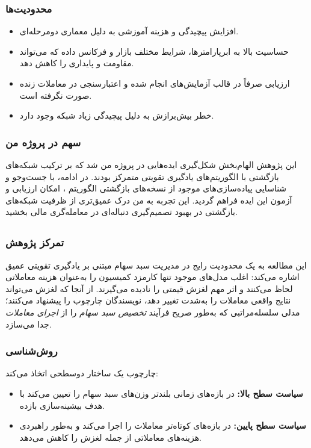 \documentclass[12pt, a4paper]{report}
\begin{document}
\subsubsection{محدودیت‌ها}
\begin{itemize}
    \item افزایش پیچیدگی و هزینه آموزشی به دلیل معماری دو‌مرحله‌ای.  
    \item حساسیت بالا به ابرپارامترها، شرایط مختلف بازار و فرکانس داده که می‌تواند مقاومت و پایداری را کاهش دهد.  
    \item ارزیابی صرفاً در قالب آزمایش‌های  انجام شده و اعتبارسنجی در معاملات زنده صورت نگرفته است.  
    \item خطر بیش‌برازش به دلیل پیچیدگی زیاد شبکه وجود دارد.  
\end{itemize}

\subsubsection{سهم در پروژه من}
این پژوهش الهام‌بخش شکل‌گیری ایده‌هایی در پروژه من شد که بر ترکیب شبکه‌های بازگشتی با الگوریتم‌های یادگیری تقویتی متمرکز بودند. در ادامه، با جست‌وجو و شناسایی پیاده‌سازی‌های موجود از نسخه‌های بازگشتی الگوریتم ، امکان ارزیابی و آزمون این ایده فراهم گردید. این تجربه به من درک عمیق‌تری از ظرفیت شبکه‌های بازگشتی در بهبود تصمیم‌گیری دنباله‌ای در معامله‌گری مالی بخشید.

\subsection{ \cite{wang2021commission}}

\subsubsection{تمرکز پژوهش}
این مطالعه به یک محدودیت رایج در مدیریت سبد سهام مبتنی بر یادگیری تقویتی عمیق اشاره می‌کند: اغلب مدل‌های موجود تنها کارمزد کمیسیون را به‌عنوان هزینه معاملاتی لحاظ می‌کنند و اثر مهم لغزش قیمتی را نادیده می‌گیرند. از آنجا که لغزش می‌تواند نتایج واقعی معاملات را به‌شدت تغییر دهد، نویسندگان چارچوب  را پیشنهاد می‌کنند؛ مدلی سلسله‌مراتبی که به‌طور صریح فرآیند \textit{تخصیص سبد سهام} را از \textit{اجرای معاملات} جدا می‌سازد.

\subsubsection{روش‌شناسی}
چارچوب  یک ساختار دوسطحی اتخاذ می‌کند:
\begin{itemize}
    \item \textbf{سیاست سطح بالا:} در بازه‌های زمانی بلندتر وزن‌های  سبد سهام را تعیین می‌کند با هدف بیشینه‌سازی بازده.  
    \item \textbf{سیاست سطح پایین:} در بازه‌های کوتاه‌تر معاملات را اجرا می‌کند و به‌طور راهبردی هزینه‌های معاملاتی از جمله لغزش را کاهش می‌دهد.  
\end{itemize}
\end{document}
